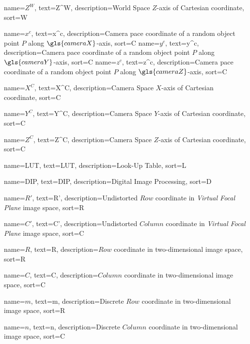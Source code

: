 %
{%
  name={$Z^W$},
  text={Z^W},
  description={World Space $Z$-axis of Cartesian coordinate},
  sort={W}
}

%
{%
  name={$x^c$},
  text={x^c},
  description={Camera pace coordinate of a random object point $P$ along $\gls{cameraX}$-axis},
  sort={C}
}
%
{%
  name={$y^c$},
  text={y^c},
  description={Camera pace coordinate of a random object point $P$ along $\gls{cameraY}$-axis},
  sort={C}
}
%
{%
  name={$z^c$},
  text={z^c},
  description={Camera pace coordinate of a random object point $P$ along $\gls{cameraZ}$-axis},
  sort={C}
}

%
{%
  name={$X^C$},
  text={X^C},
  description={Camera Space $X$-axis of Cartesian coordinate},
  sort={C}
}

%
{%
  name={$Y^C$},
  text={Y^C},
  description={Camera Space $Y$-axis of Cartesian coordinate},
  sort={C}
}

%
{%
  name={$Z^C$},
  text={Z^C},
  description={Camera Space $Z$-axis of Cartesian coordinate},
  sort={C}
}

%
{%
  name={LUT},
  text={LUT},
  description={Look-Up Table},
  sort={L}
}

%
{%
  name={DIP},
  text={DIP},
  description={Digital Image Processing},
  sort={D}
}

%
{%
  name={$R'$},
  text={R'},
  description={Undistorted $Row$ coordinate in \emph{Virtual Focal Plane} image space},
  sort={R}
}

%
{%
  name={$C'$},
  text={C'},
  description={Undistorted $Column$ coordinate in \emph{Virtual Focal Plane} image space},
  sort={C}
}

%
{%
  name={$R$},
  text={R},
  description={$Row$ coordinate in two-dimensional image space},
  sort={R}
}

%
{%
  name={$C$},
  text={C},
  description={$Column$ coordinate in two-dimensional image space},
  sort={C}
}

%
{%
  name={$m$},
  text={m},
  description={Discrete $Row$ coordinate in two-dimensional image space},
  sort={R}
}

%
{%
  name={$n$},
  text={n},
  description={Discrete $Column$ coordinate in two-dimensional image space},
  sort={C}
}

